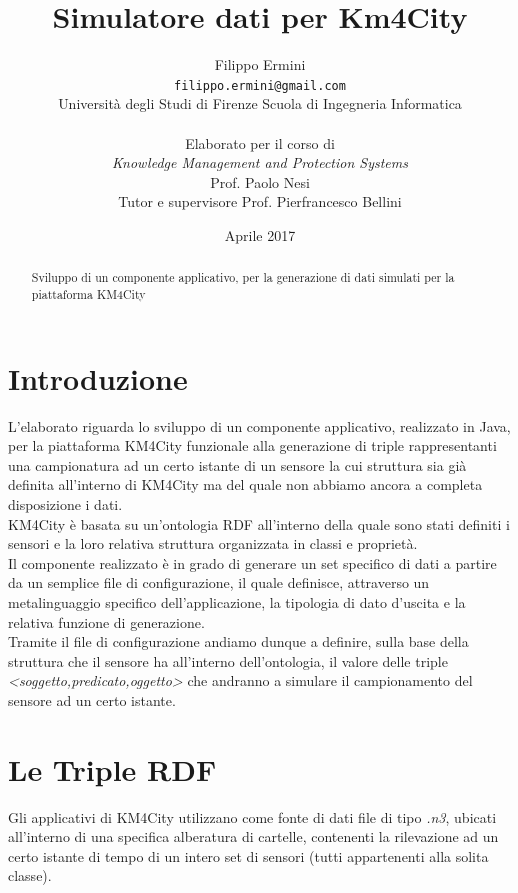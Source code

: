 \documentclass[12pt,a4paper,italian]{article}
\title{\Huge Simulatore dati per Km4City} %
\author{Filippo Ermini\\
	{\tt\small filippo.ermini@gmail.com}\\\small{Università degli Studi di Firenze Scuola di Ingegneria Informatica}\\\\Elaborato per il corso di\\ \emph{Knowledge Management and Protection Systems}\\ Prof. Paolo Nesi\\
	\newline
	\small{Tutor e supervisore Prof. Pierfrancesco Bellini}\\}
\date{Aprile 2017}
\begin{document}
	\maketitle %
	\thispagestyle{empty}
	
\begin{abstract}
	\begin{center}
		Sviluppo di un componente applicativo, per la generazione di dati simulati per la piattaforma KM4City
	\end{center}
	
\end{abstract}
	\newpage
	\tableofcontents
	\thispagestyle{empty}
	\newpage
	
\section{Introduzione}
\thispagestyle{plain}
L'elaborato riguarda lo sviluppo di un componente applicativo, realizzato in Java, per la piattaforma KM4City funzionale alla generazione di triple rappresentanti una campionatura ad un certo istante di un sensore la cui struttura sia già definita all'interno di KM4City ma del quale non abbiamo ancora a completa disposizione i dati.\\
KM4City è basata su un'ontologia RDF all'interno della quale sono stati definiti i sensori e la loro relativa struttura organizzata in classi e proprietà.\\
Il componente realizzato è in grado di generare un set specifico di dati a partire da un semplice file di configurazione, il quale definisce, attraverso un metalinguaggio specifico dell'applicazione, la tipologia di dato d'uscita e la relativa funzione di generazione.\\
Tramite il file di configurazione andiamo dunque a definire, sulla base della struttura che il sensore ha all'interno dell'ontologia, il valore delle triple \emph{<soggetto,predicato,oggetto>} che andranno
a simulare il campionamento del sensore ad un certo istante.\\
\newline
\newpage
\section{Le Triple RDF}
Gli applicativi di KM4City utilizzano come fonte di dati file di tipo \emph{.n3}, ubicati all'interno di una specifica alberatura di cartelle, 
contenenti la rilevazione ad un certo istante di tempo di un intero set di sensori (tutti appartenenti alla solita classe).
\end{document}
